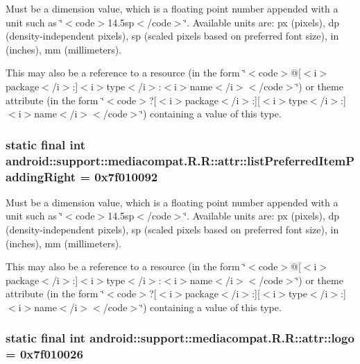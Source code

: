 Must be a dimension value, which is a floating point number appended with a unit such as \char`\"{}$<$code$>$14.5sp$<$/code$>$\char`\"{}. Available units are: px (pixels), dp (density-independent pixels), sp (scaled pixels based on preferred font size), in (inches), mm (millimeters). 

This may also be a reference to a resource (in the form \char`\"{}$<$code$>$@\mbox{[}$<$i$>$package$<$/i$>$:\mbox{]}$<$i$>$type$<$/i$>$:$<$i$>$name$<$/i$>$$<$/code$>$\char`\"{}) or theme attribute (in the form \char`\"{}$<$code$>$?\mbox{[}$<$i$>$package$<$/i$>$:\mbox{]}\mbox{[}$<$i$>$type$<$/i$>$:\mbox{]}$<$i$>$name$<$/i$>$$<$/code$>$\char`\"{}) containing a value of this type. \hypertarget{classandroid_1_1support_1_1mediacompat_1_1_r_1_1attr_a6b48d415f9cfbd77ea2587ff14ed6cc}{
\subsubsection[{listPreferredItemPaddingRight}]{\setlength{\rightskip}{0pt plus 5cm}static final int android::support::mediacompat.R.R::attr::listPreferredItemPaddingRight = 0x7f010092}}
\label{classandroid_1_1support_1_1mediacompat_1_1_r_1_1attr_a6b48d415f9cfbd77ea2587ff14ed6cc}


Must be a dimension value, which is a floating point number appended with a unit such as \char`\"{}$<$code$>$14.5sp$<$/code$>$\char`\"{}. Available units are: px (pixels), dp (density-independent pixels), sp (scaled pixels based on preferred font size), in (inches), mm (millimeters). 

This may also be a reference to a resource (in the form \char`\"{}$<$code$>$@\mbox{[}$<$i$>$package$<$/i$>$:\mbox{]}$<$i$>$type$<$/i$>$:$<$i$>$name$<$/i$>$$<$/code$>$\char`\"{}) or theme attribute (in the form \char`\"{}$<$code$>$?\mbox{[}$<$i$>$package$<$/i$>$:\mbox{]}\mbox{[}$<$i$>$type$<$/i$>$:\mbox{]}$<$i$>$name$<$/i$>$$<$/code$>$\char`\"{}) containing a value of this type. \hypertarget{classandroid_1_1support_1_1mediacompat_1_1_r_1_1attr_4221aefb526be98c00e2ea5a070f1b06}{
\subsubsection[{logo}]{\setlength{\rightskip}{0pt plus 5cm}static final int android::support::mediacompat.R.R::attr::logo = 0x7f010026}}
\label{classandroid_1_1support_1_1mediacompat_1_1_r_1_1attr_4221aefb526be98c00e2ea5a070f1b06}


